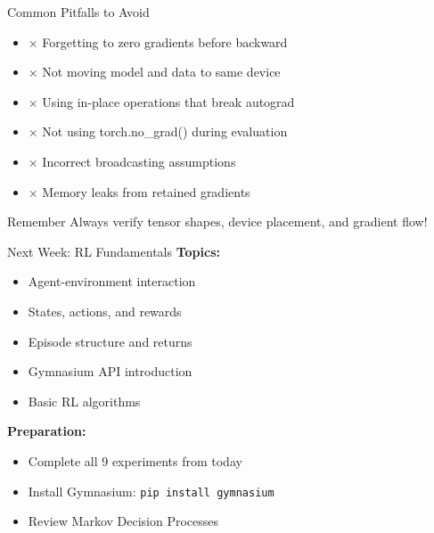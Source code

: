 \documentclass[aspectratio=169,10pt]{beamer}
\begin{document}
\begin{frame}{Common Pitfalls to Avoid}
\begin{itemize}
    \item $\times$ Forgetting to zero gradients before backward
    \item $\times$ Not moving model and data to same device
    \item $\times$ Using in-place operations that break autograd
    \item $\times$ Not using torch.no\_grad() during evaluation
    \item $\times$ Incorrect broadcasting assumptions
    \item $\times$ Memory leaks from retained gradients
\end{itemize}

\begin{block}{Remember}
Always verify tensor shapes, device placement, and gradient flow!
\end{block}
\end{frame}

\begin{frame}{Next Week: RL Fundamentals}
\textbf{Topics:}
\begin{itemize}
    \item Agent-environment interaction
    \item States, actions, and rewards
    \item Episode structure and returns
    \item Gymnasium API introduction
    \item Basic RL algorithms
\end{itemize}

\textbf{Preparation:}
\begin{itemize}
    \item Complete all 9 experiments from today
    \item Install Gymnasium: \texttt{pip install gymnasium}
    \item Review Markov Decision Processes
\end{itemize}
\end{frame}
\end{document}
